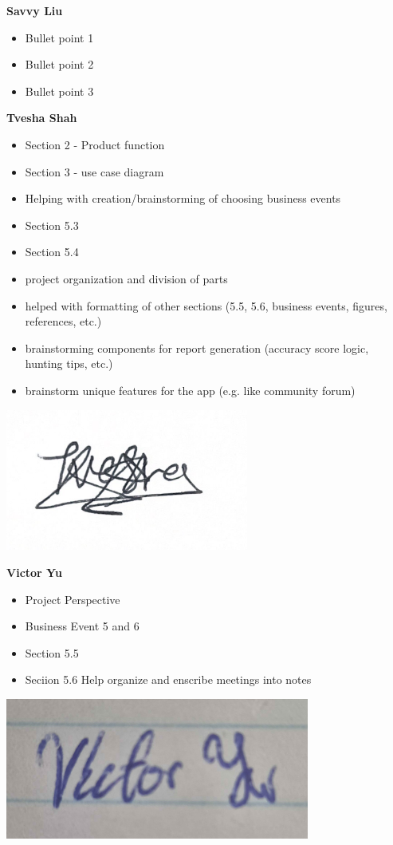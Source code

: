 \documentclass[]{article}
\begin{document}
\textbf{Savvy Liu}
\begin{itemize}
\setlength\itemindent{2em}
\item Bullet point 1
\item Bullet point 2
\item Bullet point 3
\end{itemize} 


\textbf{Tvesha Shah}
\begin{itemize}
    \setlength\itemindent{2em}
    \item Section 2 - Product function
    \item Section 3 - use case diagram 
    \item Helping with creation/brainstorming of choosing business events 
    \item Section 5.3 
    \item Section 5.4 
    \item project organization and division of parts 
    \item helped with formatting of other sections (5.5, 5.6, business events, figures, references, etc.)
    \item brainstorming components for report generation (accuracy score logic, hunting tips, etc.)
    \item brainstorm unique features for the app (e.g. like community forum)
\end{itemize}
\includegraphics[width=0.6\textwidth]{Tvesha.png}

\textbf{Victor Yu}
\begin{itemize}
    \setlength\itemindent{2em}
\item Project Perspective
\item Business Event 5 and 6
\item Section 5.5
\item Seciion 5.6
\itme Help organize and enscribe meetings into notes
\end{itemize}
\includegraphics[width=0.75\textwidth]{Victor.png}
\end{document}
